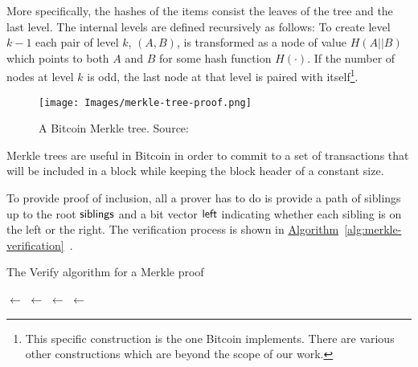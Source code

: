 More specifically, the hashes of the items consist the leaves of the tree and the last level. The internal levels are defined recursively as follows: To create level $k-1$ each pair of level $k$, $(A, B)$, is transformed as a node of value $H(A || B)$ which points to both $A$ and $B$ for some hash function $H(\cdot)$. If the number of nodes at level $k$ is odd, the last node at that level is paired with itself\footnote{This specific construction is the one Bitcoin implements. There are various other constructions which are beyond the scope of our work.}.
\vspace{0.3cm}
\begin{figure}[H]
  \centering
  \texttt{[image: Images/merkle-tree-proof.png]}
  \caption{A Bitcoin Merkle tree. Source:~\cite{mastering}}
  \label{fig:merkletree}
\end{figure}
\vspace{0.3cm}

Merkle trees are useful in Bitcoin in order to commit to a set of transactions that will be included in a block while keeping the block header of a constant size.
\pagebreak

To provide proof of inclusion, all a prover has to do is provide a path of siblings up to the root $\sf{siblings}$ and a bit vector $\sf{left}$ indicating whether each sibling is on the left or the right. The verification process is shown in \hyperref[alg:merkle-verification]{Algorithm}~\ref{alg:merkle-verification}~\cite{gtklocker}.
\vspace{0.3cm}
\begin{algorithm}
  \caption{\label{alg:merkle-verification}The \textsf{Verify} algorithm
    for a Merkle proof}
    \begin{algorithmic}[1]
            \State {} $\gets$ 
              \State {} $\gets$ 
                \State {} $\gets$ 
              \Else
                \State {} $\gets$ 
              \EndIf
            \EndWhile
            \State{}
        \EndFunction
    \end{algorithmic}
\end{algorithm}
\vspace{0.3cm}

